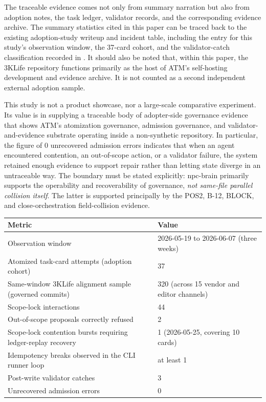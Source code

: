 \documentclass[9pt,letterpaper]{extarticle}
\newcommand{\TableFont}{\fontsize{8.2}{9.4}\selectfont}
\newcommand{\TableLead}[1]{\par\smallskip\noindent{\raggedright\small\bfseries #1\par}\smallskip}
\begin{document}
The traceable evidence comes not only from summary narration but also from adoption notes, the task ledger, validator records, and the corresponding evidence archive. The summary statistics cited in this paper can be traced back to the existing adoption-study writeup and incident table, including the entry for this study's observation window, the 37-card cohort, and the validator-catch classification recorded in \texttt{}. It should also be noted that, within this paper, the 3KLife repository functions primarily as the host of ATM's self-hosting development and evidence archive. It is not counted as a second independent external adoption sample.

This study is not a product showcase, nor a large-scale comparative experiment. Its value is in supplying a traceable body of adopter-side governance evidence that shows ATM's atomization governance, admission governance, and validator-and-evidence substrate operating inside a non-synthetic repository. In particular, the figure of 0 unrecovered admission errors indicates that when an agent encountered contention, an out-of-scope action, or a validator failure, the system retained enough evidence to support repair rather than letting state diverge in an untraceable way. The boundary must be stated explicitly: npc-brain primarily supports the operability and recoverability of governance, \emph{not same-file parallel collision itself}. The latter is supported principally by the POS2, B-12, BLOCK, and close-orchestration field-collision evidence.

\TableLead{Table 8 --- npc-brain Three-Week Adoption Summary.}

\begingroup
\TableFont
\setlength{\tabcolsep}{3pt}
\begin{longtable}{@{}L{0.31\textwidth}L{0.65\textwidth}@{}}
\toprule
Metric & Value \\
\midrule
Observation window & 2026-05-19 to 2026-06-07 (three weeks) \\
Atomized task-card attempts (adoption cohort) & 37 \\
Same-window 3KLife alignment sample (governed commits) & 320 (across 15 vendor and editor channels) \\
Scope-lock interactions & 44 \\
Out-of-scope proposals correctly refused & 2 \\
Scope-lock contention bursts requiring ledger-replay recovery & 1 (2026-05-25, covering 10 cards) \\
Idempotency breaks observed in the CLI runner loop & at least 1 \\
Post-write validator catches & 3 \\
Unrecovered admission errors & 0 \\
\bottomrule
\end{longtable}
\endgroup
\end{document}
